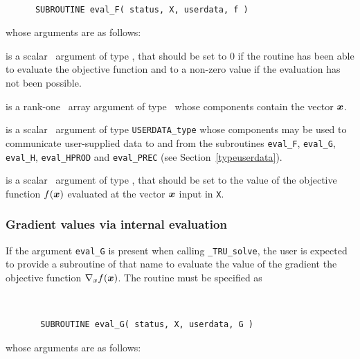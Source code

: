 \documentclass{galahad}
\newcommand{\packagename}{TRU}
\newcommand{\fullpackagename}{\libraryname\_\packagename}
\newcommand{\solver}{{\tt \fullpackagename\_solve}}
\begin{document}
\def\baselinestretch{0.8}
{\tt
\begin{verbatim}
      SUBROUTINE eval_F( status, X, userdata, f )
\end{verbatim}
}
\def\baselinestretch{1.0}
\noindent whose arguments are as follows:

\begin{description}
 is a scalar \intentout\ argument of type \integer,
that should be set to 0 if the routine has been able to evaluate
the objective function
and to a non-zero value if the evaluation has not been possible.

 is a rank-one \intentin\ array argument of type \realdp\
whose components contain the vector ${\bm{x}}$.

 is a scalar \intentinout\ argument of type
{\tt USERDATA\_type} whose components may be used
to communicate user-supplied data to and from the
subroutines {\tt eval\_F}, {\tt eval\_G},
{\tt eval\_H}, {\tt eval\_HPROD} and {\tt eval\_PREC}
(see Section~\ref{typeuserdata}).

 is a scalar \intentout\ argument of type \realdp,
that should be set to the value of the objective function $f({\bm{x}})$
evaluated at the vector ${\bm{x}}$ input in {\tt X}.

\end{description}


\subsubsection{Gradient values via internal evaluation\label{gfv}}

If the argument {\tt eval\_G} is present when calling \solver, the
user is expected to provide a subroutine of that name to evaluate the
value of the gradient the objective function $\nabla_x f({\bm{x}})$.
The routine must be specified as

\def\baselinestretch{0.8}
{\tt
\begin{verbatim}
       SUBROUTINE eval_G( status, X, userdata, G )
\end{verbatim} }
\def\baselinestretch{1.0}
\noindent whose arguments are as follows:
\end{document}

